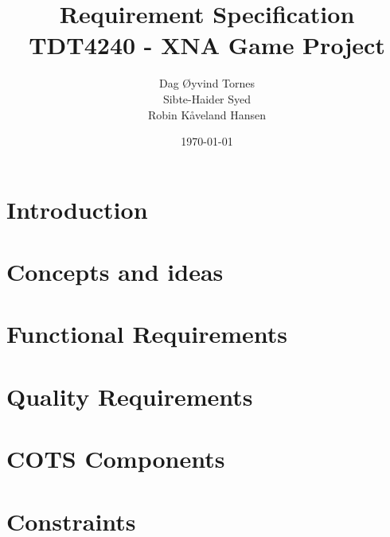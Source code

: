 \documentclass[titlepage,a4paper,11pt]{article}
\date{\today}
\begin{document}
\title{Requirement Specification\\
 		TDT4240 - XNA Game Project}

\author{Dag Øyvind Tornes\\
 		Sibte-Haider Syed\\ 
		Robin Kåveland Hansen\\}
\maketitle

\pagestyle{empty}
\tableofcontents
\clearpage
\pagestyle{plain}

\section{Introduction}


\section{Concepts and ideas}
\label{concepts}


\section{Functional Requirements}
\label{funcreq}








% 

\section{Quality Requirements}
\label{qualreq}

\section{COTS Components}
\label{components}


\section{Constraints}
\label{constraints}

\end{document}
